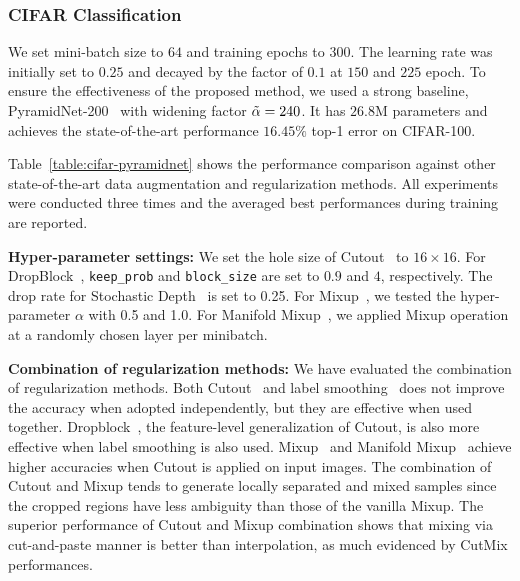
\subsubsection{CIFAR Classification}
\label{sec:CIFAR-100-classification}
We set mini-batch size to $64$ and training epochs to $300$.
The learning rate was initially set to $0.25$ and decayed by the factor of $0.1$ at $150$ and $225$ epoch.
To ensure the effectiveness of the proposed method, we used a strong baseline, PyramidNet-200~\cite{pyramidnet} with widening factor $\Tilde{\alpha}=240$. It has  $26.8$M parameters and achieves the state-of-the-art performance $16.45\%$ top-1 error on CIFAR-100.



Table~\ref{table:cifar-pyramidnet} shows the performance comparison against other state-of-the-art data augmentation and regularization methods. 
All experiments were conducted three times and the averaged best performances during training are reported.

\noindent\textbf{Hyper-parameter settings:}
We set the hole size of Cutout~\cite{devries2017cutout} to $16\times16$.
For DropBlock~\cite{ghiasi2018dropblock}, \texttt{keep\_prob} and \texttt{block\_size} are set to $0.9$ and $4$, respectively.
The drop rate for Stochastic Depth~\cite{stochasticdepth} is set to 0.25. 
For Mixup~\cite{zhang2017mixup}, we tested the hyper-parameter $\alpha$ with 0.5 and 1.0.
For Manifold Mixup~\cite{verma2018manifoldmixup}, we applied Mixup operation at a randomly chosen layer per minibatch. 





\noindent\textbf{Combination of regularization methods:}
We have evaluated the combination of regularization methods.
Both Cutout~\cite{devries2017cutout} and label smoothing~\cite{szegedy2016rethinking_labelsm} does not improve the accuracy when adopted independently, but they are effective when used together.
Dropblock~\cite{ghiasi2018dropblock}, the feature-level generalization of Cutout, is also more effective when label smoothing is also used.
Mixup~\cite{zhang2017mixup} and Manifold Mixup~\cite{verma2018manifoldmixup} achieve higher accuracies when Cutout is applied on input images.
{The combination of Cutout and Mixup tends to generate locally separated and mixed samples since the cropped regions have less ambiguity than those of the vanilla Mixup. The superior performance of Cutout and Mixup combination shows that mixing via cut-and-paste manner is better than interpolation, as much evidenced by CutMix performances.
}

